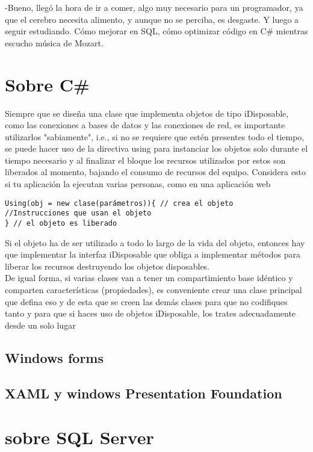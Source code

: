 \documentclass[12pt,spanish,lettersize]{book}
\begin{document}
-Bueno, lleg\'o la hora de ir a comer, algo muy necesario para un programador, ya que el cerebro necesita alimento, y aunque no se perciba, es desgaste. Y luego a seguir estudiando. C\'omo mejorar en SQL, c\'omo optimizar c\'odigo en C\# mientras escucho m\'usica de Mozart.\\

\chapter{Sobre C\#}

Siempre que se dise\~na una clase que implementa objetos de tipo iDisposable, como las conexiones a bases de datos y las conexiones de red, es importante utilizarlos "sabiamente", i.e., si no se requiere que est\'en presentes todo el tiempo, se puede hacer uso de la directiva using para instanciar los objetos solo durante el tiempo necesario y al finalizar el bloque los recursos utilizados por estos son liberados al momento, bajando el consumo de recursos del equipo. Considera esto si tu aplicaci\'on la ejecutan varias personas, como en una aplicaci\'on web \\
\begin{verbatim}
Using(obj = new clase(parámetros)){ // crea el objeto 
//Instrucciones que usan el objeto 
} // el objeto es liberado 
\end{verbatim}

Si el objeto ha de ser utilizado a todo lo largo de la vida del objeto, entonces hay que implementar la interfaz iDisposable que obliga a implementar m\'etodos para liberar los recursos destruyendo los objetos disposables. \\

De igual forma, si varias clases van a tener un compartimiento base id\'entico y comparten caracter\'isticas (propiedades), es conveniente crear una clase principal que defina eso y de esta que se creen las dem\'as clases para que no codifiques tanto y para que si haces uso de objetos iDisposable, los trates adecuadamente desde un solo lugar\\

\section{Windows forms}
\section{XAML y windows Presentation Foundation}
\chapter{sobre SQL Server}
\end{document}
